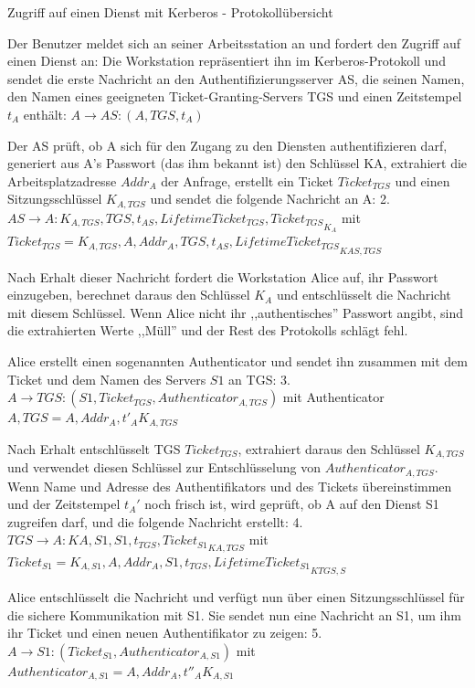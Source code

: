 \documentclass[a4paper]{article}
\begin{document}
\begin{multicols}{3}
      Zugriff auf einen Dienst mit Kerberos - Protokollübersicht
      \begin{itemize*}
            \item Der Benutzer meldet sich an seiner Arbeitsstation an und fordert den Zugriff auf einen Dienst an: Die Workstation repräsentiert ihn im Kerberos-Protokoll und sendet die erste Nachricht an den Authentifizierungsserver AS, die seinen Namen, den Namen eines geeigneten Ticket-Granting-Servers TGS und einen Zeitstempel $t_A$ enthält:  $A\rightarrow AS:(A, TGS, t_A)$
            \item Der AS prüft, ob A sich für den Zugang zu den Diensten authentifizieren darf, generiert aus A's Passwort (das ihm bekannt ist) den Schlüssel KA, extrahiert die Arbeitsplatzadresse $Addr_A$ der Anfrage, erstellt ein Ticket $Ticket_{TGS}$ und einen Sitzungsschlüssel $K_{A,TGS}$ und sendet die folgende Nachricht an A: 2. $AS\rightarrow A:{ K_{A,TGS}, TGS, t_{AS}, LifetimeTicket_{TGS}, Ticket_{TGS}}_{K_A}$ mit $Ticket_{TGS}={K_{A,TGS},A, Addr_A, TGS, t_{AS}, LifetimeTicket_{TGS}}_{{K}{AS,TGS}}$
            \item Nach Erhalt dieser Nachricht fordert die Workstation Alice auf, ihr Passwort einzugeben, berechnet daraus den Schlüssel $K_A$ und entschlüsselt die Nachricht mit diesem Schlüssel. Wenn Alice nicht ihr ,,authentisches'' Passwort angibt, sind die extrahierten Werte ,,Müll'' und der Rest des Protokolls schlägt fehl.
            \item Alice erstellt einen sogenannten Authenticator und sendet ihn zusammen mit dem Ticket und dem Namen des Servers $S1$ an TGS: 3. $A\rightarrow TGS:(S1, Ticket_{TGS}, Authenticator_{A,TGS})$ mit Authenticator $A,TGS={A,Addr_A,t'_{A}}{K_{A,TGS}}$
            \item Nach Erhalt entschlüsselt TGS $Ticket_{TGS}$, extrahiert daraus den Schlüssel $K_{A,TGS}$ und verwendet diesen Schlüssel zur Entschlüsselung von $Authenticator_{A,TGS}$. Wenn Name und Adresse des Authentifikators und des Tickets übereinstimmen und der Zeitstempel $t_A'$ noch frisch ist, wird geprüft, ob A auf den Dienst S1 zugreifen darf, und die folgende Nachricht erstellt: 4. $TGS\rightarrow A:{{K}{A,S1}, S1, t_{TGS}, Ticket_{S1}}_{{K}{A,TGS}}$ mit $Ticket_{S1}={K_{A,S1}, A, Addr_A, S1, t_{TGS}, LifetimeTicket_{S1}}_{{K}{TGS,S}}$
            \item Alice entschlüsselt die Nachricht und verfügt nun über einen Sitzungsschlüssel für die sichere Kommunikation mit S1. Sie sendet nun eine Nachricht an S1, um ihm ihr Ticket und einen neuen Authentifikator zu zeigen: 5. $A\rightarrow S1:(Ticket_{S1}, Authenticator_{A,S1})$ mit $Authenticator_{A,S1}={A,Addr_A, t''_{A}}{K_{A,S1}}$

\end{itemize*}
\end{multicols}
\end{document}
